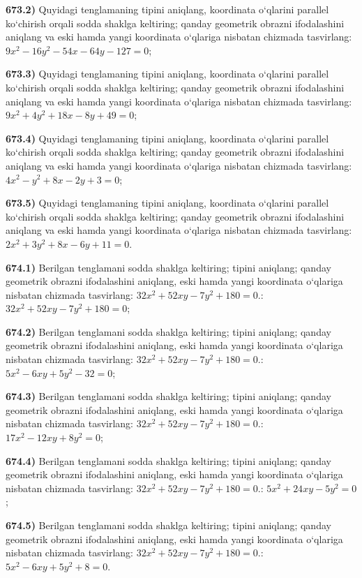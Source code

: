 \textbf{673.2)} Quyidagi tenglamaning tipini aniqlang, koordinata o‘qlarini parallel ko‘chirish orqali sodda shaklga keltiring; qanday geometrik obrazni ifodalashini aniqlang va eski hamda yangi koordinata o‘qlariga nisbatan chizmada tasvirlang: $9 x^2-16 y^2-54 x-64 y-127=0$;

\textbf{673.3)} Quyidagi tenglamaning tipini aniqlang, koordinata o‘qlarini parallel ko‘chirish orqali sodda shaklga keltiring; qanday geometrik obrazni ifodalashini aniqlang va eski hamda yangi koordinata o‘qlariga nisbatan chizmada tasvirlang: $9 x^2+4 y^2+18 x-8 y+49=0$;

\textbf{673.4)} Quyidagi tenglamaning tipini aniqlang, koordinata o‘qlarini parallel ko‘chirish orqali sodda shaklga keltiring; qanday geometrik obrazni ifodalashini aniqlang va eski hamda yangi koordinata o‘qlariga nisbatan chizmada tasvirlang: $4 x^2-y^2+8 x-2 y+3=0$;

\textbf{673.5)} Quyidagi tenglamaning tipini aniqlang, koordinata o‘qlarini parallel ko‘chirish orqali sodda shaklga keltiring; qanday geometrik obrazni ifodalashini aniqlang va eski hamda yangi koordinata o‘qlariga nisbatan chizmada tasvirlang: $2 x^2+3 y^2+8 x-6 y+11=0$.

\textbf{674.1)} Berilgan tenglamani sodda shaklga keltiring; tipini aniqlang; qanday geometrik obrazni ifodalashini aniqlang, eski hamda yangi koordinata o‘qlariga nisbatan chizmada tasvirlang: $32x^2+52xy-7y^2+180=0$.: $32 x^2+52 x y-7 y^2+180=0$;

\textbf{674.2)} Berilgan tenglamani sodda shaklga keltiring; tipini aniqlang; qanday geometrik obrazni ifodalashini aniqlang, eski hamda yangi koordinata o‘qlariga nisbatan chizmada tasvirlang: $32x^2+52xy-7y^2+180=0$.: $5 x^2-6 x y+5 y^2-32=0$;

\textbf{674.3)} Berilgan tenglamani sodda shaklga keltiring; tipini aniqlang; qanday geometrik obrazni ifodalashini aniqlang, eski hamda yangi koordinata o‘qlariga nisbatan chizmada tasvirlang: $32x^2+52xy-7y^2+180=0$.: $17 x^2-12 x y+8 y^2=0$;

\textbf{674.4)} Berilgan tenglamani sodda shaklga keltiring; tipini aniqlang; qanday geometrik obrazni ifodalashini aniqlang, eski hamda yangi koordinata o‘qlariga nisbatan chizmada tasvirlang: $32x^2+52xy-7y^2+180=0$.: $5 x^2+24 x y-5 y^2=0$;

\textbf{674.5)} Berilgan tenglamani sodda shaklga keltiring; tipini aniqlang; qanday geometrik obrazni ifodalashini aniqlang, eski hamda yangi koordinata o‘qlariga nisbatan chizmada tasvirlang: $32x^2+52xy-7y^2+180=0$.: $5 x^2-6 x y+5 y^2+8=0$.



